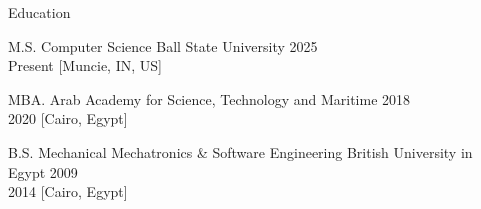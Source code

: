 \begin{rSection}{Education}
    \begin{rESubsection}
        {M.S. Computer Science}
        {Ball State University}
        {2025 \\ Present}
        [Muncie, IN, US] %
    \end{rESubsection}

    \begin{rESubsection}
        {MBA.}
        {Arab Academy for Science, Technology and Maritime}
        {2018 \\ 2020}
        [Cairo, Egypt] %
    \end{rESubsection}

    \begin{rESubsection}
        {B.S. Mechanical Mechatronics & Software Engineering}
        {British University in Egypt}
        {2009 \\ 2014}
        [Cairo, Egypt] %
    \end{rESubsection}
\end{rSection}